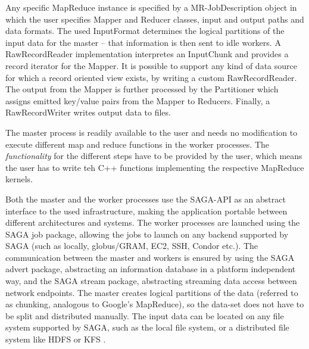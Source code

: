 \documentclass[3p,twocolumn]{elsarticle}
\begin{document}
Any specific MapReduce instance
is specified by a MR-JobDescription object in which the user specifies 
Mapper and Reducer classes, input and output paths and data formats.  The
used InputFormat determines the logical partitions of the input data for
the master -- that information is then sent to idle workers.  A
Raw\-Record\-Reader implementation interpretes an
InputChunk and provides a record iterator for the Mapper. It is
possible to support any kind of data source for which a record
oriented view exists, by writing a custom Raw\-Record\-Reader.
The output from the Mapper is further processed by the Partitioner
which assigns emitted key/value pairs from the Mapper to Reducers.
Finally, a Raw\-Record\-Writer writes output data to files.

The master process is readily available to the user and needs no
modification to execute different map and reduce functions in the
worker processes.
The \textit{functionality} for the different steps have to be provided by
the user, which means the user has to write teh C++ functions
implementing the respective MapReduce kernels.

Both the master and the worker processes use the SAGA-API as an
abstract interface to the used infrastructure, making the application
portable between different architectures and systems.  The worker
processes are launched using the SAGA job package, allowing the jobs
to launch on any backend supported by SAGA (such as locally, globus/GRAM, 
EC2, SSH, Condor etc.).  The communication between the master and workers
is ensured by using the SAGA advert package, abstracting an
information database in a platform independent way, and the SAGA stream
package, abstracting streaming data access between network endpoints.
The master creates logical partitions of the data (referred to as chunking,
analogous to Google's MapReduce), so the data-set does not have to be split
and distributed manually.  The input data can be located on any file system
supported by SAGA, such as the local file system, or a distributed file system
like HDFS or KFS \cite{KFS}.
\end{document}
